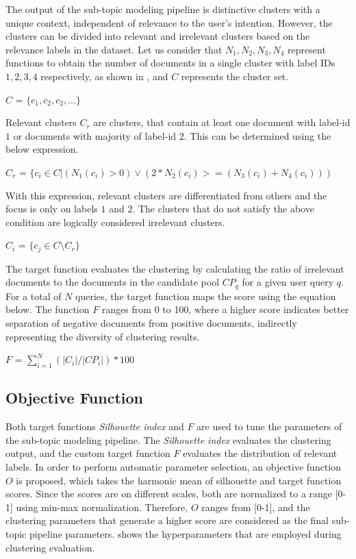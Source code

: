 		
The output of the sub-topic modeling pipeline is distinctive clusters with a unique context, independent of relevance to the user's intention. However, the clusters can be divided into relevant and irrelevant clusters based on the relevance labels in the dataset. Let us consider that $N_1, N_2, N_3, N_4$ represent functions to obtain the number of documents in a single cluster with label IDs $1, 2, 3, 4$ respectively, as shown in , and $C$ represents the cluster set.
		
		\centerline{$C$ = $\{c_1, c_2, c_2,\dots\}$}
		
		Relevant clusters $C_r$ are clusters, that contain at least one document with label-id $1$ or documents with majority of label-id $2$. This can be determined using the below expression.
		
		\centerline{$C_r$ = $\{c_i \in C | (N_1(c_i) > 0) \lor (2 * N_2(c_i) >= (N_3(c_i) + N_4(c_i))) $}
		
		With this expression, relevant clusters are differentiated from others and the focus is only on labels $1$ and $2$. The clusters that do not satisfy the above condition are logically considered irrelevant clusters. 
		
		\centerline{$C_i$ = $\{c_j \in C \setminus C_r\} $}
		
The target function evaluates the clustering by calculating the ratio of irrelevant documents to the documents in the candidate pool $CP_q$ for a given user query $q$. For a total of $N$ queries, the target function maps the score using the equation below. The function $F$ ranges from 0 to 100, where a higher score indicates better separation of negative documents from positive documents, indirectly representing the diversity of clustering results.

		
		\centerline{$F$ = $\sum\limits_{i=1}^N (|C_i|/|CP_i|) * 100 $}
		
		\subsection{Objective Function} Both target functions \textit{Silhouette index} and $F$ are used to tune the parameters of the sub-topic modeling pipeline. The \textit{Silhouette index} evaluates the clustering output, and the custom target function $F$ evaluates the distribution of relevant labels. In order to perform automatic parameter selection, an objective function $O$ is proposed, which takes the harmonic mean of silhouette and target function scores. Since the scores are on different scales, both are normalized to a range [0-1] using min-max normalization. Therefore, $O$ ranges from [0-1], and the clustering parameters that generate a higher score are considered as the final sub-topic pipeline parameters.  shows the hyperparameters that are employed during clustering evaluation.\\
		
